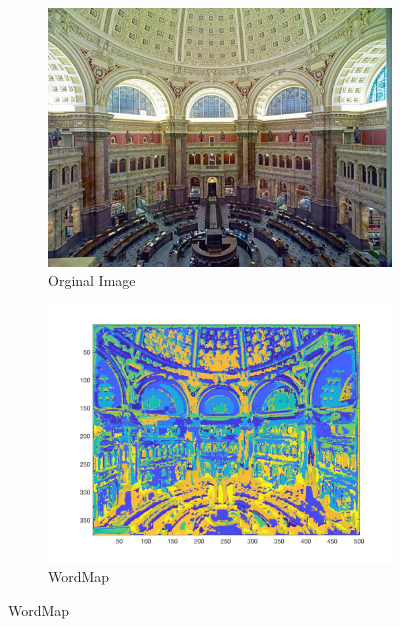 \documentclass[a4paper,11pt]{article}
\begin{document}
\begin{figure}
	\centering
	\begin{subfigure}{.5\textwidth}
		\centering
		\includegraphics[width=\textwidth]{release/matlab/fig5}
		\caption{Orginal Image}
		\label{fig:sub1}
	\end{subfigure}%
	\begin{subfigure}{.5\textwidth}
		\centering
		\includegraphics[width=\textwidth]{release/matlab/WordMap5}
		\caption{WordMap}
		\label{fig:sub2}
	\end{subfigure}
\end{figure}
\end{document}
